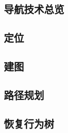 \subsection{导航技术总览}



\subsection{定位}



\subsection{建图}



\subsection{路径规划}



\subsection{恢复行为树}

